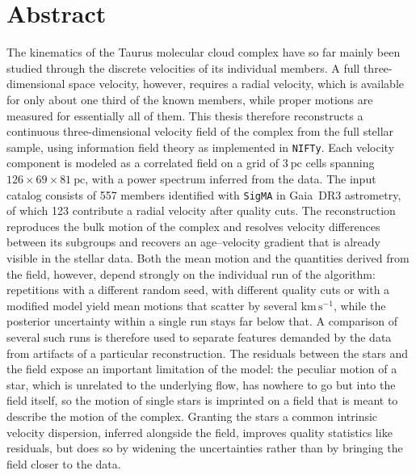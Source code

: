 \chapter{Abstract}
The kinematics of the Taurus molecular cloud complex have so far mainly been studied through the
discrete velocities of its individual members. A full three-dimensional space velocity, however,
requires a radial velocity, which is available for only about one third of the known members, while
proper motions are measured for essentially all of them. This thesis therefore reconstructs a
continuous three-dimensional velocity field of the complex from the full stellar sample, using
information field theory as implemented in \texttt{NIFTy}. Each velocity component is modeled as a
correlated field on a grid of $3~\mathrm{pc}$ cells spanning $126 \times 69 \times 81~\mathrm{pc}$,
with a power spectrum inferred from the data. The input catalog consists of 557 members identified with \texttt{SigMA} in
Gaia~DR3 astrometry, of which 123 contribute a radial velocity after quality cuts.
The reconstruction reproduces the bulk motion of the complex and resolves velocity differences between
its subgroups and recovers an age--velocity gradient that is already visible in the stellar data.
Both the mean motion and the quantities derived from the field, however, depend strongly on the
individual run of the algorithm: repetitions with a different random seed, with different quality cuts or with a
modified model yield mean motions that scatter by several $\mathrm{km\,s^{-1}}$, while the posterior
uncertainty within a single run stays far below that. A comparison of several such runs is therefore
used to separate features demanded by the data from artifacts of a particular reconstruction. The
residuals between the stars and the field expose an important limitation of the model: the peculiar
motion of a star, which is unrelated to the underlying flow, has nowhere to go but into the field
itself, so the motion of single stars is imprinted on a field that is meant to describe the motion
of the complex. Granting the stars a common intrinsic
velocity dispersion, inferred alongside the field, improves quality statistics like residuals,
but does so by widening the uncertainties rather than by bringing the field closer to the data.
